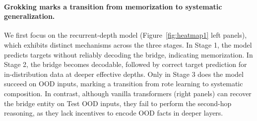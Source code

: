 \documentclass{article} %
\begin{document}
\paragraph{Grokking marks a transition from memorization to systematic generalization.} 
We first focus on the recurrent-depth model (Figure~\ref{fig:heatmap1}  left panels), which exhibits distinct mechanisms across the three stages.
In Stage 1, the model predicts targets without reliably decoding the bridge, indicating memorization.
In Stage 2, the bridge becomes decodable, followed by correct target prediction for in-distribution data at deeper effective depths.
Only in Stage 3 does the model succeed on OOD inputs, marking a transition from rote learning to systematic composition.
In contrast, although vanilla transformers (right panels) can recover the bridge entity on Test OOD inputs, they fail to perform the second-hop reasoning, as they lack incentives to encode OOD facts in deeper layers.

\end{document}
